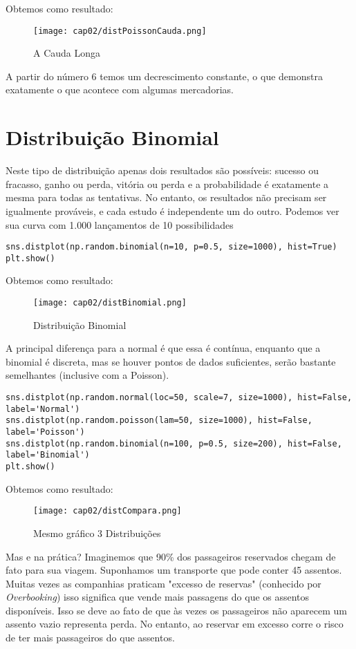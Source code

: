 Obtemos como resultado:
\begin{figure}[H]
	\centering
	\texttt{[image: cap02/distPoissonCauda.png]}
	\caption{A Cauda Longa}
\end{figure}

A partir do número 6 temos um decrescimento constante, o que demonstra exatamente o que acontece com algumas mercadorias.

\section{Distribuição Binomial}
Neste tipo de distribuição apenas dois resultados são possíveis: sucesso ou fracasso, ganho ou perda, vitória ou perda e a probabilidade é exatamente a mesma para todas as tentativas. No entanto, os resultados não precisam ser igualmente prováveis, e cada estudo é independente um do outro. Podemos ver sua curva com 1.000 lançamentos de 10 possibilidades
\begin{lstlisting}[]
sns.distplot(np.random.binomial(n=10, p=0.5, size=1000), hist=True)
plt.show()
\end{lstlisting}

Obtemos como resultado:
\begin{figure}[H]
	\centering
	\texttt{[image: cap02/distBinomial.png]}
	\caption{Distribuição Binomial}
\end{figure}

A principal diferença para a normal é que essa é contínua, enquanto que a binomial é discreta, mas se houver pontos de dados suficientes, serão bastante semelhantes (inclusive com a Poisson).

\begin{lstlisting}[]
sns.distplot(np.random.normal(loc=50, scale=7, size=1000), hist=False, label='Normal')
sns.distplot(np.random.poisson(lam=50, size=1000), hist=False, label='Poisson')
sns.distplot(np.random.binomial(n=100, p=0.5, size=200), hist=False, label='Binomial')
plt.show()
\end{lstlisting}

Obtemos como resultado:
\begin{figure}[H]
	\centering
	\texttt{[image: cap02/distCompara.png]}
	\caption{Mesmo gráfico 3 Distribuições}
\end{figure}

Mas e na prática? Imaginemos que 90\% dos passageiros reservados chegam de fato para sua viagem. Suponhamos um transporte que pode conter 45 assentos. Muitas vezes as companhias praticam "excesso de reservas" (conhecido por \textit{Overbooking}) isso significa que vende mais passagens do que os assentos disponíveis. Isso se deve ao fato de que às vezes os passageiros não aparecem um assento vazio representa perda. No entanto, ao reservar em excesso corre o risco de ter mais passageiros do que assentos.

